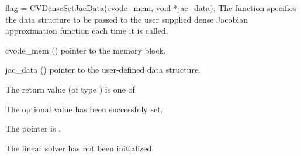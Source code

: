 {
  flag = CVDenseSetJacData(cvode\_mem, void *jac\_data);
}
{
  The function  specifies the data structure
  to be passed to the user supplied dense Jacobian approximation 
  function each time it is called.
}
{
  \begin{args}
  \item[cvode\_mem] ()
    pointer to the {\cvode} memory block.
  \item[jac\_data] ()
    pointer to the user-defined data structure.
  \end{args}
}
{
  The return value  (of type ) is one of
  \begin{args}
  \item[\Id{SUCCESS}] 
    The optional value has been successfuly set.
  \item[\Id{LIN\_NO\_MEM}]
    The  pointer is .
  \item[\Id{LIN\_NO\_LMEM}]
    The {\cvdense} linear solver has not been initialized.
  \end{args}
}
{}
